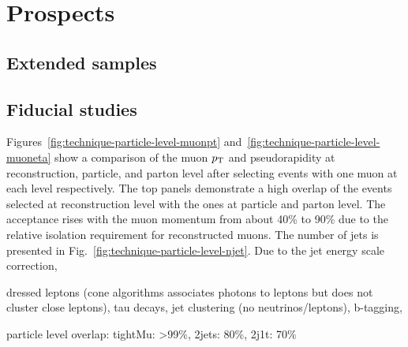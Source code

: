\section{Prospects}

\subsection{Extended samples}

\subsection{Fiducial studies}
\label{sec:diff13-fiducial-studies}



Figures~\ref{fig:technique-particle-level-muonpt} and~\ref{fig:technique-particle-level-muoneta} show a comparison of the muon $p_\textrm{T}$ and pseudorapidity at reconstruction, particle, and parton level after selecting events with one muon at each level respectively. The top panels demonstrate a high overlap of the events selected at reconstruction level with the ones at particle and parton level. The acceptance rises with the muon momentum from about 40\% to 90\% due to the relative isolation requirement for reconstructed muons. The number of jets is presented in Fig.~\ref{fig:technique-particle-level-njet}. Due to the jet energy scale correction, 


dressed leptons (cone algorithms associates photons to leptons but does not cluster close leptons), tau decays, jet clustering (no neutrinos/leptons), b-tagging,




particle level overlap: tightMu: >99\%, 2jets: 80\%, 2j1t: 70\%


